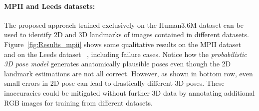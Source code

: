 \documentclass[10pt,twocolumn,letterpaper]{article}
\begin{document}

\paragraph{MPII and Leeds datasets:}
The  proposed approach trained exclusively on the Human3.6M dataset can
be used to identify 2D and 3D landmarks of images contained in
different datasets. Figure~\ref{fig:Results_mpii} shows some
qualitative results on the MPII
dataset~\cite{Andriluka:etal:CVPR:2014} and
on the Leeds dataset ~\cite{Johnson10}, including failure cases. Notice how the 
\textit{probabilistic 3D pose model} generates anatomically plausible
poses even though the 2D landmark estimations are not all
correct. However, as shown in bottom row, even small errors in 2D pose
can lead to drastically different 3D poses. These inaccuracies could
be mitigated without further 3D data by annotating additional RGB
images for training from different datasets.


\end{document}
